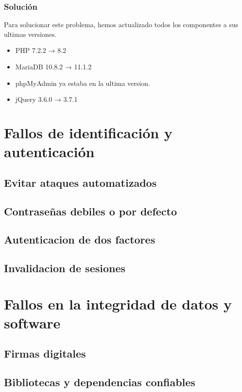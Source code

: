 \documentclass{report}
\begin{document}
                \subsubsection{Solución}
                    Para solucionar este problema, hemos actualizado todos los componentes a sus ultimas versiones.
                    \begin{itemize}
                        \item PHP 7.2.2 → 8.2
                        \item MariaDB 10.8.2 → 11.1.2
                        \item phpMyAdmin ya estaba en la ultima version.
                        \item jQuery 3.6.0 → 3.7.1
                    \end{itemize}
        \clearpage
        \section{Fallos de identificación y autenticación}
            \subsection{Evitar ataques automatizados}
            \subsection{Contraseñas debiles o por defecto}
            \subsection{Autenticacion de dos factores}
            \subsection{Invalidacion de sesiones}
        \clearpage
        \section{Fallos en la integridad de datos y software}
            \subsection{Firmas digitales}
            \subsection{Bibliotecas y dependencias confiables}
\end{document}
